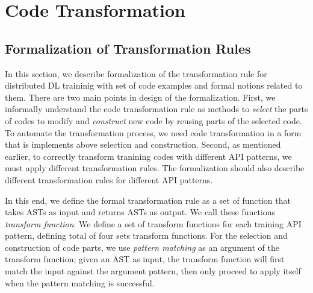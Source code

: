 \section{Code Transformation}\label{sec:trans}

\subsection{Formalization of Transformation Rules}

In this section, we describe formalization of the transformation rule
for distributed DL traininig with set of code examples and formal notions
related to them.
There are two main points in design of the formalization.
First, we informally understand the code transformation rule as methods to
\textit{select} the parts of codes to modify and \textit{construct} new code by 
reusing parts of the selected code.
To automate the transformation process, we need code transformation in a form 
that is implements above selection and construction.
Second, as mentioned earlier, to correctly transform tranining codes with different
API patterns, we must apply different transformation rules.
The formalization should also describe different transformation rules
for different API patterns.

In this end, we define the formal transformation rule as a set of
function that takes ASTs as input and returns ASTs as output.
We call these functions \textit{transform function}.
We define a set of transform functions for each training API pattern,
defining total of four sets transform functions.
For the selection and construction of code parts,
we use \textit{pattern matching} as an argument of the transform function;
given an AST as input, the transform function will first match the
input against the argument pattern, then only proceed to apply itself
when the pattern matching is successful.

